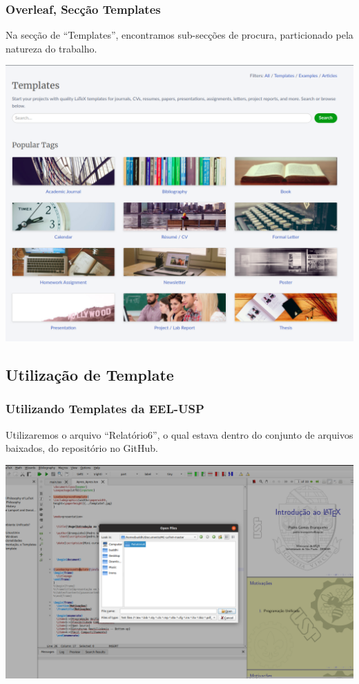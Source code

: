 \documentclass{beamer}
\begin{document}
\begin{frame}
  \frametitle{Overleaf, Secção Templates}
  Na secção de ``Templates'', encontramos sub-secções de procura,
  particionado pela natureza do trabalho.
  \begin{center}
    \includegraphics[scale=0.20]{../Imagens/OVERL2.png}
  \end{center}

\end{frame}


\begin{frame}
  \section{Utilização de Template}
  \frametitle{Utilizando Templates da EEL-USP}
  Utilizaremos o arquivo ``Relatório6'', o qual estava dentro do
  conjunto de arquivos baixados, do repositório no GitHub.

  \begin{center}
    \includegraphics[scale=0.20]{../Imagens/ST1.png}
  \end{center}
\end{frame}
\end{document}
